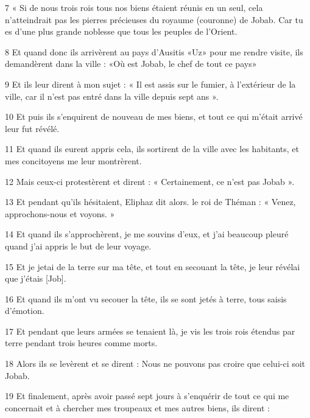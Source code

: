 \par 7 « Si de nous trois rois tous nos biens étaient réunis en un seul, cela n'atteindrait pas les pierres précieuses du royaume (couronne) de Jobab. Car tu es d'une plus grande noblesse que tous les peuples de l'Orient.

\par 8 Et quand donc ils arrivèrent au pays d'Ausitis «Uz» pour me rendre visite, ils demandèrent dans la ville : «Où est Jobab, le chef de tout ce pays»

\par 9 Et ils leur dirent à mon sujet : « Il est assis sur le fumier, à l'extérieur de la ville, car il n'est pas entré dans la ville depuis sept ans ».

\par 10 Et puis ils s'enquirent de nouveau de mes biens, et tout ce qui m'était arrivé leur fut révélé.

\par 11 Et quand ils eurent appris cela, ils sortirent de la ville avec les habitants, et mes concitoyens me leur montrèrent.

\par 12 Mais ceux-ci protestèrent et dirent : « Certainement, ce n'est pas Jobab ».

\par 13 Et pendant qu'ils hésitaient, Eliphaz dit alors. le roi de Théman : « Venez, approchons-nous et voyons. »

\par 14 Et quand ils s'approchèrent, je me souvins d'eux, et j'ai beaucoup pleuré quand j'ai appris le but de leur voyage.

\par 15 Et je jetai de la terre sur ma tête, et tout en secouant la tête, je leur révélai que j'étais [Job].

\par 16 Et quand ils m'ont vu secouer la tête, ils se sont jetés à terre, tous saisis d'émotion.

\par 17 Et pendant que leurs armées se tenaient là, je vis les trois rois étendus par terre pendant trois heures comme morts.

\par 18 Alors ils se levèrent et se dirent : Nous ne pouvons pas croire que celui-ci soit Jobab.

\par 19 Et finalement, après avoir passé sept jours à s'enquérir de tout ce qui me concernait et à chercher mes troupeaux et mes autres biens, ils dirent :

